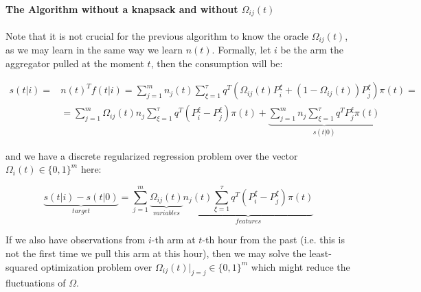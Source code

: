 \paragraph{The Algorithm without a knapsack and without $\Omega_{ij}(t)$} Note that it is not crucial for the previous algorithm to know the oracle $\Omega_{ij}(t)$, as we may learn in the same way we learn $n(t)$. Formally, let $i$ be the arm the aggregator pulled at the moment $t$, then the consumption will be:

    \begin{equation}
        \begin{split}
            s(t|i) = & n(t)^Tf(t|i) = \sum_{j=1}^m n_j(t)\sum_{\xi = 1}^\tau q^T(\Omega_{ij}(t)P^{\xi}_i + (1-\Omega_{ij}(t))P^{\xi}_j)\pi(t) = \\
            & = \sum_{j=1}^m\Omega_{ij}(t) n_j \sum_{\xi = 1}^{\tau}q^T(P_i^\xi-P_j^\xi)\pi(t) + \underbrace{\sum_{j=1}^{m}n_j\sum_{\xi=1}^\tau q^TP_j^\xi\pi(t)}_{s(t|0)}
        \end{split}
    \end{equation}
    
    and we have a discrete regularized regression problem over the vector $\Omega_{i}(t) \in \{0, 1\}^m$ here:
    
    \begin{equation}
        \underbrace{s(t|i) - s(t|0)}_{target} = \sum_{j=1}^m\underbrace{\Omega_{ij}(t)}_{variables} \underbrace{n_j(t)\sum_{\xi=1}^\tau q^T(P_i^\xi - P_j^\xi)\pi(t)}_{features}
    \end{equation}
    
    
 If we also have observations from $i$-th arm at $t$-th hour from the past (i.e. this is not the first time we pull this arm at this hour), then we may solve the least-squared optimization problem over $\Omega_{ij}(t)|_{j=j} \in \{0, 1\}^m$ which might reduce the fluctuations of $\Omega$. 
 
